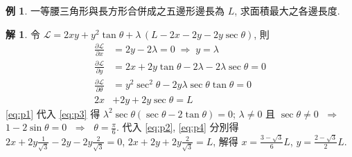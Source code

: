 \documentclass[12pt]{extarticle}
\newcommand{\ds}{\displaystyle}
\newcommand{\ie}{\;\Longrightarrow\;}
\theoremstyle{definition}
\newtheorem*{ex}{例}
\newtheorem*{sol}{解}
\newcommand{\pdiff}[2]{\frac{\partial #1}{\partial #2}}
\begin{document}
%
%

\begin{ex}
  一等腰三角形與長方形合併成之五邊形邊長為 $L$, 求面積最大之各邊長度.
\end{ex}

\begin{sol}
  令 $\ds\mathcal{L} = 2xy + y^2\tan\theta + \lambda\,(L - 2x - 2y - 2y\sec\theta)$, 則
  \begin{align}
    \pdiff{\mathcal{L}}{x} &= 2 y - 2\lambda = 0 \ie y = \lambda\label{eq:p1}\\
    \pdiff{\mathcal{L}}{y} &= 2 x + 2 y\tan\theta - 2\lambda - 2\lambda\sec\theta = 0\label{eq:p2}\\
    \pdiff{\mathcal{L}}{\theta} &= y^2\sec^2\theta - 2y\lambda\sec\theta\tan\theta = 0\label{eq:p3}\\
    2x &+ 2y + 2y\sec\theta = L \label{eq:p4}
  \end{align}
  \eqref{eq:p1} 代入 \eqref{eq:p3} 得 $\lambda^2\sec\theta(\sec\theta - 2\tan\theta) = 0$; $\lambda\ne 0$ 且 $\sec\theta\ne 0$ $\ie$ $1 - 2\sin\theta = 0$ $\ie$ $\theta = \frac{\pi}{6}$. 代入 \eqref{eq:p2}, \eqref{eq:p4} 分別得 $2x + 2y\frac{1}{\sqrt{3}} - 2y - 2y\frac{2}{\sqrt{3}} = 0$, $2 x + 2y + 2y\frac{2}{\sqrt{3}} = L$, 解得 $x = \frac{3 - \sqrt{3}}{6}L$, $y = \frac{2 - \sqrt{3}}{2}L$. 
\end{sol}
\end{document}
